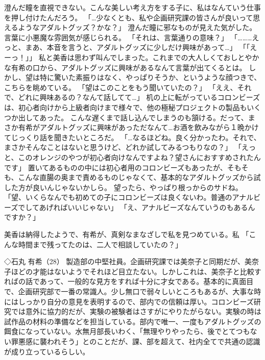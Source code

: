 澄んだ瞳を直視できない。こんな美しい考え方をする子に、私はなんていう仕事を押し付けたんだろう。
「…少なくとも、私や企画研究課の皆さんが良いって思えるようなアダルトグッズ？かな？」
澄んだ瞳に邪なものが見えた気がした。言葉に小悪魔な雰囲気が感じられる。
「それは、言葉通りの意味？」
「………えっと、まあ、本音を言うと、アダルトグッズに少しだけ興味があって…」
「「えーっ！」」
私と美香は思わず叫んでしまった。これまでの大人しくておしとやかな有希の口から、アダルトグッズに興味があるなんて言葉が出てくるとは。
しかし、望は特に驚いた素振りはなく、やっぱりそうか、というような顔つきで、こちらを眺めている。
「望はこのことをもう聞いていたの？」
「ええ、それで、どれに興味あるの？なんて話してて…」
机の上に転がっているコロンビーズは、初心者向けから上級者向けまで様々で、他の極秘プロジェクトの製品もいくつか出してあった。
こんな遅くまで話し込んでしまうのも頷ける。だって、まさか有希がアダルトグッズに興味があっただなんて…お酒を飲みながら１晩かけてじっくり話を聞きたいところだ。
「…なるほどね。良く分かったわ。それで、まさかそんなことはないと思うけど、どれか試してみるつもりなの？」
「えっと、このオレンジのやつが初心者向けなんですよね？望さんにおすすめされたんです」
置いてあるものの中には初心者用のコロンビーズもあったが、そもそも、こんな直腸の奥まで責めるものじゃなくて、基本的なアダルトグッズから試した方が良いんじゃないかしら。
望ったら、やっぱり根っからのサドね。
「望、いくらなんでも初めての子にコロンビーズは良くないわ。普通のアナルビーズでしてあげればいいじゃない」
「え、アナルビーズなんていうのもあるんですか？」



美香は納得したようで、有希が、真剣なまなざしで私を見つめている。私
「こんな時間まで残ってたのは、二人で相談していたの？」







◇石丸 有希（28）
製造部の中堅社員。企画研究課では美奈子と同期だが、美奈子ほどの才能はないようでそれほど目立たない。しかしこれは、美奈子と比較すればの話であって、一般的な見方をすれば十分に才女である。基本的に真面目で、企画研究部で一番の常識人。少し無口で弱々しいところもあるが、大事な時にはしっかり自分の意見を表明するので、部内での信頼は厚い。コロンビーズ研究では意外に協力的だが、実験の被験者はさすがにやりたがらない。実験の時は試作品の材料の準備などを担当している。部内で唯一、一度もアダルトグッズの餌食になっていない。水無月部長いわく、「無理やりやったら、後でとてつもない罪悪感に襲われそう」とのことだが、課、部を超えて、社内全てで共通の認識が成り立っているらしい。




